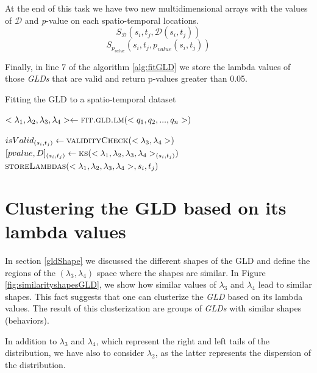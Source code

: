 At the end of this task we have two new multidimensional arrays with the values of $\mathcal{D}$ and \textit{p}-value on each spatio-temporal locations.
\begin{equation}
S_{\mathcal{D}}(s_{i},t_{j},\mathcal{D}(s_{i},t_{j}))
\end{equation}
\begin{equation}
S_{p_{value}}(s_{i},t_{j},p_{value}(s_{i},t_{j}))
\end{equation}

Finally, in line 7 of the algorithm \ref{alg:fitGLD} we store the lambda values of those \textit{GLDs} that are valid and return p-values greater than 0.05.

\begin{algorithm} 
\caption{Fitting the GLD to a spatio-temporal dataset}\label{alg:fitGLD}
\begin{algorithmic}[1] 
\State $<\lambda_{1},\lambda_{2},\lambda_{3},\lambda_{4}> \gets \Call {fit.gld.lm}{<q_1,q_2,...,q_n>}$

\State $isValid_{(s_{i},t_{j})} \gets \Call {validityCheck}{<\lambda_{3},\lambda_{4}>}$
\State $[pvalue,D]_{(s_{i},t_{j})} \gets \Call{ks}{<\lambda_{1},\lambda_{2},\lambda_{3},\lambda_{4}>_{(s_{i},t_{j})}}$
\EndIf
{}
\State $\Call{storeLambdas}{<\lambda_{1},\lambda_{2},\lambda_{3},\lambda_{4}>,s_{i},t_{j}}$
\EndIf
\EndFunction 
\end{algorithmic} 
\end{algorithm} 

\section{Clustering the GLD based on its lambda values}
\label{Clusterizing the GLD based in its lambda values}
In section \ref{gldShape} we discussed the different shapes of the GLD and define the regions of the $(\lambda_{3}, \lambda_{4})$ space where the shapes are similar. In Figure \ref{fig:similarityshapesGLD}, we show how  similar values of $\lambda_{3}$ and $\lambda_{4}$ lead to similar shapes. This fact suggests that one can clusterize the \textit{GLD} based on its lambda values. The  result of this clusterization are groups of \textit{GLDs} with similar shapes (behaviors).

In addition to $\lambda_{3}$ and $\lambda_{4}$, which  represent the right and left tails of the distribution, we have also to consider $\lambda_{2}$, as the latter represents the dispersion of the distribution. 

